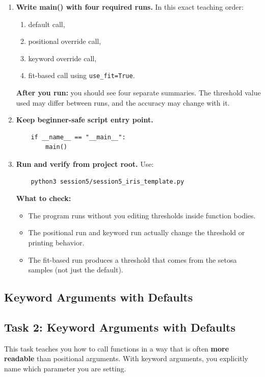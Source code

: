\begin{enumerate}
    \item \textbf{Write main() with four required runs.}
    In this exact teaching order:
    \begin{enumerate}
        \item default call,
        \item positional override call,
        \item keyword override call,
        \item fit-based call using \texttt{use\_fit=True}.
    \end{enumerate}
    \noindent
    \textbf{After you run:} you should see four separate summaries. The threshold value used may differ between runs, and the accuracy may change with it.

    \item \textbf{Keep beginner-safe script entry point.}
    \begin{verbatim}
    if __name__ == "__main__":
        main()
    \end{verbatim}

    \item \textbf{Run and verify from project root.}
    Use:
    \begin{verbatim}
    python3 session5/session5_iris_template.py
    \end{verbatim}
    \noindent
    \textbf{What to check:}
    \begin{itemize}\setlength{\itemsep}{2pt}
        \item The program runs without you editing thresholds inside function bodies.
        \item The positional run and keyword run actually change the threshold or printing behavior.
        \item The fit-based run produces a threshold that comes from the setosa samples (not just the default).
    \end{itemize}
\end{enumerate}

\subsection{Keyword Arguments with Defaults}

\subsection{Task 2: Keyword Arguments with Defaults}
This task teaches you how to call functions in a way that is often \textbf{more readable} than positional arguments.
With keyword arguments, you explicitly name which parameter you are setting.

